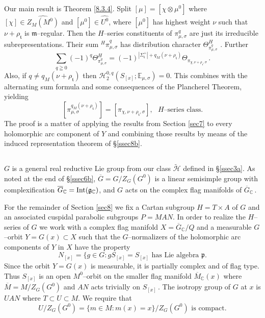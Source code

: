 \documentclass{conm-p-l}
\renewcommand{\gg}{\mathfrak{g}}
\newcommand{\gp}{\mathfrak{p}}
\def\gg{\mathfrak{g}}
\def\gm{\mathfrak{m}}
\def\gp{\mathfrak{p}}
\def\gt{\mathfrak{t}}
\def\Int{{\rm Int}}
\def\C{\mathbb{C}}
\def\E{\mathbb{E}}
\def\cH{\mathcal{H}}
\begin{document}
Our main result is Theorem \ref{8.3.4}.  Split $[\mu] = [\chi\otimes\mu^0]$ 
where
$[\chi] \in \widehat{Z_M(M^0)}$ and $[\mu^0] \in \widehat{U^0}$, 
where $[\mu^0]$ has highest
weight $\nu$ such that $\nu + \rho_\gt$ is $\gm$--regular. Then the
$H$--series constituents of $\pi_{\mu,\sigma}^q$ are just its irreducible
subrepresentations.  Their sum ${^H\pi}^q_{\mu,\sigma}$ has distribution
character $\Theta^H_{\pi_{\mu,\sigma}^q}$\,\,.  Further  
$$
{\sum}_{q \geqq 0} (-1)^q
	\Theta^H_{\pi_{\mu,\sigma}^q} 
	= (-1)^{|\Sigma^+_\gt| + q_M(\nu + \rho_\gt)} 
		\Theta_{\pi_{\chi,\nu + \rho_\gt,\sigma}}\,.
$$
Also, if $q \ne q_M(\nu + \rho_\gt)$ then
$\cH_2^{0,q}(S_{[x]};\E_{\mu,\sigma}) = 0$.  This combines with the
alternating sum formula and some consequences of the Plancherel Theorem,
yielding 
$$
[\pi_{\mu,\sigma}^{q_M(\nu + \rho_\gt)}]
	= [\pi_{\chi, \nu + \rho_\gt,\sigma}], 
	\text{ $H$--series class.}
$$
The proof is a matter of applying the results from Section \ref{sec7} to 
every holomorphic arc component of $Y$ and combining those results by means 
of the induced representation theorem of \S \ref{ssec8b}.

\subsection{}\label{ssec8a}\setcounter{equation}{0}
$G$ is a general real reductive Lie group from our class $\widetilde{\cH}$ 
defined in \S \ref{ssec3a}.  As noted at the end of \S \ref{ssec6b}, 
$\overline{G} = G/Z_G(G^0)$ is a linear semisimple group with complexification 
$\overline{G}_\C = \Int(\gg_\C)$, and $G$ acts on the complex 
flag manifolds of $\overline{G}_\C$\,.

For the remainder of Section \ref{sec8} we fix a Cartan subgroup $H = T\times A$
of $G$ and an associated cuspidal parabolic subgroups $P=MAN$.
In order to realize the $H$--series of $G$ we work with a complex flag
manifold $X = \overline{G}_\C/Q$ and a measurable $G$--orbit 
$Y = G(x) \subset X$
such that the $G$--normalizers of the holomorphic arc components  of $Y$
in $X$ have the property 
\begin{equation}\label{8.1.2c}
N_{[x]} = \{g \in G : gS_{[x]} = S_{[x]}
	\text{ has Lie algebra } \gp.
\end{equation}
Since the orbit $Y = G(x)$ is measurable, it is partially complex and of
flag type.  Thus $S_{[x]}$ is an open $M^0$--orbit on the smaller flag manifold
$\overline{M}_\C(x)$ where $\overline{M} = M/Z_G(G^0)$ and $AN$ acts
trivially on $S_{[x]}$\,.  The isotropy group of $G$ at $x$ is $UAN$
where $T \subset U \subset M$.  We require that 
\begin{equation}\label{8.1.2d}
U/Z_G(G^0) = \{m \in M : m(x) = x\}/Z_G(G^0) \text{ is compact.}
\end{equation}
\end{document}
